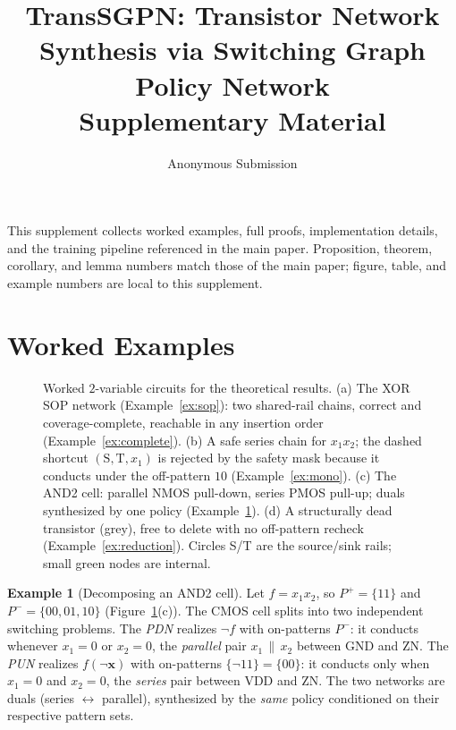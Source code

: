 \documentclass[letterpaper]{article}
\theoremstyle{plain}
\theoremstyle{definition}
\newtheorem{example}{Example}
\newcommand{\Pon}{P^{+}}
\newcommand{\Poff}{P^{-}}
\newcommand{\method}{TransSGPN}
\begin{document}
\title{\method: Transistor Network Synthesis via
       Switching Graph Policy Network\\[2pt]
       \large Supplementary Material}
\author{Anonymous Submission}
\affiliations{}
\maketitle

\setcounter{secnumdepth}{2}
\appendix

\noindent This supplement collects worked examples, full proofs, implementation
details, and the training pipeline referenced in the main paper.  Proposition,
theorem, corollary, and lemma numbers match those of the main paper; figure,
table, and example numbers are local to this supplement.

\section{Worked Examples}
\label{app:examples}

\begin{figure}[t]
\centering
\resizebox{\columnwidth}{!}{}
\caption{Worked $2$-variable circuits for the theoretical results.
(a) The XOR SOP network (Example~\ref{ex:sop}): two shared-rail chains,
correct and coverage-complete, reachable in any insertion order
(Example~\ref{ex:complete}).
(b) A safe series chain for $x_1x_2$; the dashed shortcut $(\mathrm{S},
\mathrm{T},x_1)$ is rejected by the safety mask because it conducts under the
off-pattern $10$ (Example~\ref{ex:mono}).
(c) The AND2 cell: parallel NMOS pull-down, series PMOS pull-up; duals
synthesized by one policy (Example~\ref{ex:dual}).
(d) A structurally dead transistor (grey), free to delete with no off-pattern
recheck (Example~\ref{ex:reduction}).
Circles S/T are the source/sink rails; small green nodes are internal.}
\label{fig:examples}
\end{figure}

\begin{example}[Decomposing an AND2 cell]
\label{ex:dual}
Let $f = x_1 x_2$, so $\Pon=\{11\}$ and $\Poff=\{00,01,10\}$
(Figure~\ref{fig:examples}(c)).
The CMOS cell splits into two independent switching problems.
The \emph{PDN} realizes $\lnot f$ with on-patterns $\Poff$: it conducts
whenever $x_1{=}0$ or $x_2{=}0$, the \emph{parallel} pair $x_1 \,\|\, x_2$
between $\mathrm{GND}$ and $\mathrm{ZN}$.
The \emph{PUN} realizes $f(\lnot\mathbf{x})$ with on-patterns
$\{\lnot 11\}=\{00\}$: it conducts only when $x_1{=}0$ and $x_2{=}0$, the
\emph{series} pair between $\mathrm{VDD}$ and $\mathrm{ZN}$.
The two networks are duals (series $\leftrightarrow$ parallel), synthesized by
the \emph{same} policy conditioned on their respective pattern sets.
\end{example}
\end{document}
